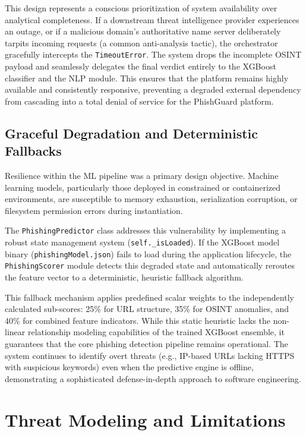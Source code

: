 This design represents a conscious prioritization of system availability
over analytical completeness. If a downstream threat intelligence
provider experiences an outage, or if a malicious domain's authoritative
name server deliberately tarpits incoming requests (a common
anti-analysis tactic), the orchestrator gracefully intercepts the
\texttt{TimeoutError}. The system drops the incomplete OSINT payload and
seamlessly delegates the final verdict entirely to the XGBoost
classifier and the NLP module. This ensures that the platform remains
highly available and consistently responsive, preventing a degraded
external dependency from cascading into a total denial of service for
the PhishGuard platform.

\subsection{Graceful Degradation and Deterministic
Fallbacks}\label{graceful-degradation-and-deterministic-fallbacks}

Resilience within the ML pipeline was a primary design objective.
Machine learning models, particularly those deployed in constrained or
containerized environments, are susceptible to memory exhaustion,
serialization corruption, or filesystem permission errors during
instantiation.

The \texttt{PhishingPredictor} class addresses this vulnerability by
implementing a robust state management system
(\texttt{self.\_isLoaded}). If the XGBoost model binary
(\texttt{phishingModel.json}) fails to load during the application
lifecycle, the \texttt{PhishingScorer} module detects this degraded
state and automatically reroutes the feature vector to a deterministic,
heuristic fallback algorithm.

This fallback mechanism applies predefined scalar weights to the
independently calculated sub-scores: 25\% for URL structure, 35\% for
OSINT anomalies, and 40\% for combined feature indicators. While this
static heuristic lacks the non-linear relationship modeling capabilities
of the trained XGBoost ensemble, it guarantees that the core phishing
detection pipeline remains operational. The system continues to identify
overt threats (e.g., IP-based URLs lacking HTTPS with suspicious
keywords) even when the predictive engine is offline, demonstrating a
sophisticated defense-in-depth approach to software engineering.

\section{Threat Modeling and
Limitations}\label{threat-modeling-and-limitations}

